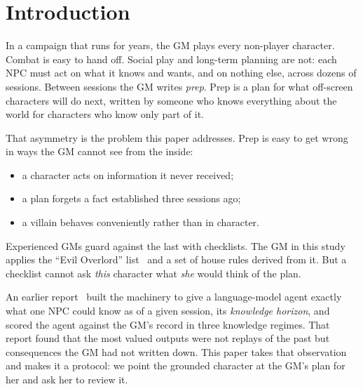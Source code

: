\documentclass[11pt]{article}
\begin{document}
\section{Introduction}

In a campaign that runs for years, the GM plays every non-player character. Combat is easy
to hand off. Social play and long-term planning are not: each NPC must act on what it
knows and wants, and on nothing else, across dozens of sessions. Between sessions the GM
writes \emph{prep}. Prep is a plan for what off-screen characters will do next, written by
someone who knows everything about the world for characters who know only part of it.

That asymmetry is the problem this paper addresses. Prep is easy to get wrong in ways the
GM cannot see from the inside:
\begin{itemize}[nosep]
\item a character acts on information it never received;
\item a plan forgets a fact established three sessions ago;
\item a villain behaves conveniently rather than in character.
\end{itemize}
Experienced GMs guard against the last with checklists. The GM in this study applies the
``Evil Overlord'' list~\citep{anspach} and a set of house rules derived from it. But a
checklist cannot ask \emph{this} character what \emph{she} would think of the plan.

An earlier report~\citep{roussos2026horizon} built the machinery to give a language-model
agent exactly what one NPC could know as of a given session, its \emph{knowledge horizon},
and scored the agent against the GM's record in three knowledge regimes. That report found
that the most valued outputs were not replays of the past but consequences the GM had not
written down. This paper takes that observation and makes it a protocol: we point the
grounded character at the GM's plan for her and ask her to review it.
\end{document}
